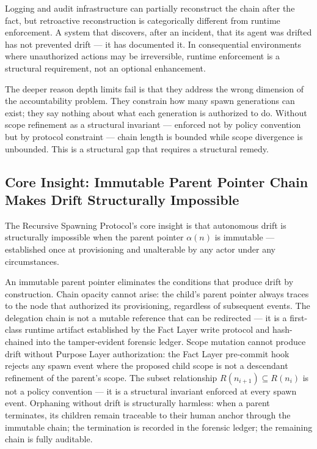 Logging and audit infrastructure can partially reconstruct the chain after the fact, but retroactive reconstruction is categorically different from runtime enforcement. A system that discovers, after an incident, that its agent was drifted has not prevented drift — it has documented it. In consequential environments where unauthorized actions may be irreversible, runtime enforcement is a structural requirement, not an optional enhancement.

The deeper reason depth limits fail is that they address the wrong dimension of the accountability problem. They constrain how many spawn generations can exist; they say nothing about what each generation is authorized to do. Without scope refinement as a structural invariant — enforced not by policy convention but by protocol constraint — chain length is bounded while scope divergence is unbounded. This is a structural gap that requires a structural remedy.

\subsection{Core Insight: Immutable Parent Pointer Chain Makes Drift Structurally Impossible}

The Recursive Spawning Protocol's core insight is that autonomous drift is structurally impossible when the parent pointer $\alpha(n)$ is immutable — established once at provisioning and unalterable by any actor under any circumstances.

An immutable parent pointer eliminates the conditions that produce drift by construction. Chain opacity cannot arise: the child's parent pointer always traces to the node that authorized its provisioning, regardless of subsequent events. The delegation chain is not a mutable reference that can be redirected — it is a first-class runtime artifact established by the Fact Layer write protocol and hash-chained into the tamper-evident forensic ledger. Scope mutation cannot produce drift without Purpose Layer authorization: the Fact Layer pre-commit hook rejects any spawn event where the proposed child scope is not a descendant refinement of the parent's scope. The subset relationship $R(n_{i+1}) \subseteq R(n_i)$ is not a policy convention — it is a structural invariant enforced at every spawn event. Orphaning without drift is structurally harmless: when a parent terminates, its children remain traceable to their human anchor through the immutable chain; the termination is recorded in the forensic ledger; the remaining chain is fully auditable.

